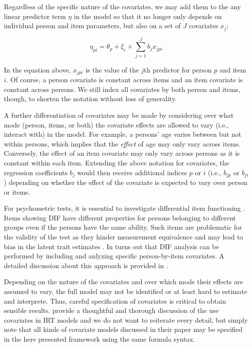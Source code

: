 \documentclass[jss]{jss}
\begin{document}
Regardless of the specific nature of the covariates, we may add them to
the any linear predictor term \(\eta\) in the model so that it no longer
only depends on individual person and item parameters, but also on a set
of \(J\) covariates \(x_j\):

\[
\eta_{pi} = \theta_p + \xi_i + \sum_{j=1}^J b_j x_{jpi}
\]

In the equation above, \(x_{jpi}\) is the value of the \(j\)th predictor
for person \(p\) and item \(i\). Of course, a person covariate is
constant across items and an item covariate is constant across persons.
We still index all covariates by both person and items, though, to
shorten the notation without loss of generality.

A further differentiation of covariates may be made by considering over
what mode (person, items, or both) the covariate effects are allowed to
vary (i.e., interact with) in the model. For example, a persons' age
varies between but not within persons, which implies that the
\emph{effect} of age may only vary across items. Conversely, the effect
of an item covariate may only vary across persons as it is constant
within each item. Extending the above notation for covariates, the
regression coefficients \(b_j\) would then receive additional indices
\(p\) or \(i\) (i.e., \(b_{jp}\) or \(b_{ji}\)) depending on whether the
effect of the covariate is expected to vary over person or items.

For psychometric tests, it is essential to investigate differential item
functioning \citep[DIF;][]{holland2012}. Items showing DIF have
different properties for persons belonging to different groups even if
the persons have the same ability. Such items are problematic for the
validity of the test as they hinder measurement equivalence and may lead
to bias in the latent trait estimates \citep{millsap1993, holland2012}.
In turns out that DIF analysis can be performed by including and
anlyzing specific person-by-item covariates. A detailed discussion about
this approach is provided in \citet{deboeck2011}.

Depending on the nature of the covariates and over which mode their
effects are assumed to vary, the full model may not be identified or at
least hard to estimate and interprete. Thus, careful specification of
covariates is critical to obtain sensible results. \citet{deboeck2011}
provide a thoughtful and thorough discussion of the use covariates in
IRT models and we do not want to reiterate every detail, but simply note
that all kinds of covariate models discussed in their paper may be
specified in the here presented framework using the same formula syntax.
\end{document}

